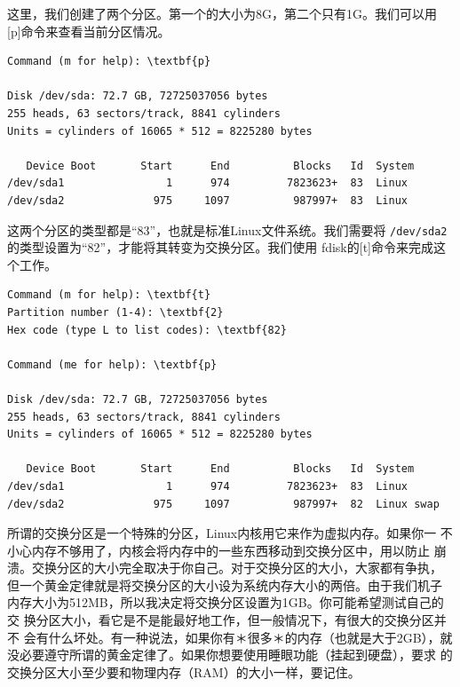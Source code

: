 这里，我们创建了两个分区。第一个的大小为8G，第二个只有1G。我们可以用
[p]命令来查看当前分区情况。
\begin{Verbatim}[frame=single,commandchars=\\\{\}]
 Command (m for help): \textbf{p}

Disk /dev/sda: 72.7 GB, 72725037056 bytes
255 heads, 63 sectors/track, 8841 cylinders
Units = cylinders of 16065 * 512 = 8225280 bytes

   Device Boot       Start      End          Blocks   Id  System
/dev/sda1                1      974         7823623+  83  Linux
/dev/sda2              975     1097          987997+  83  Linux
\end{Verbatim}
这两个分区的类型都是``83''，也就是标准Linux文件系统。我们需要将
\texttt{/dev/sda2}的类型设置为``82''，才能将其转变为交换分区。我们使用
fdisk的[t]命令来完成这个工作。
\begin{Verbatim}[frame=single,commandchars=\\\{\}]
Command (m for help): \textbf{t}
Partition number (1-4): \textbf{2}
Hex code (type L to list codes): \textbf{82}

Command (me for help): \textbf{p}

Disk /dev/sda: 72.7 GB, 72725037056 bytes
255 heads, 63 sectors/track, 8841 cylinders
Units = cylinders of 16065 * 512 = 8225280 bytes

   Device Boot       Start      End          Blocks   Id  System
/dev/sda1                1      974         7823623+  83  Linux
/dev/sda2              975     1097          987997+  82  Linux swap
\end{Verbatim}
所谓的交换分区是一个特殊的分区，Linux内核用它来作为虚拟内存。如果你一
不小心内存不够用了，内核会将内存中的一些东西移动到交换分区中，用以防止
崩溃。交换分区的大小完全取决于你自己。对于交换分区的大小，大家都有争执，
但一个黄金定律就是将交换分区的大小设为系统内存大小的两倍。由于我们机子
内存大小为512MB，所以我决定将交换分区设置为1GB。你可能希望测试自己的交
换分区大小，看它是不是能最好地工作，但一般情况下，有很大的交换分区并不
会有什么坏处。有一种说法，如果你有＊很多＊的内存（也就是大于2GB），就
没必要遵守所谓的黄金定律了。如果你想要使用睡眼功能（挂起到硬盘），要求
的交换分区大小至少要和物理内存（RAM）的大小一样，要记住。


